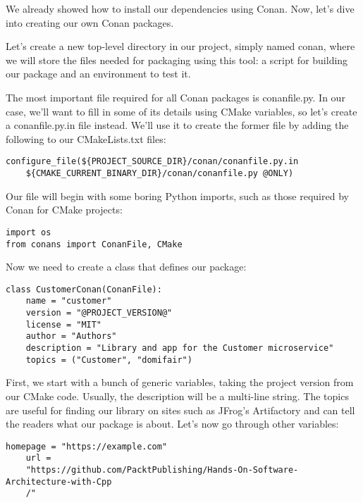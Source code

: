 
We already showed how to install our dependencies using Conan. Now, let's dive into creating our own Conan packages.

Let's create a new top-level directory in our project, simply named conan, where we will store the files needed for packaging using this tool: a script for building our package and an environment to test it.


The most important file required for all Conan packages is conanfile.py. In our case, we'll want to fill in some of its details using CMake variables, so let's create a conanfile.py.in file instead. We'll use it to create the former file by adding the following to our CMakeLists.txt files:

\begin{lstlisting}[style=styleCMake]
configure_file(${PROJECT_SOURCE_DIR}/conan/conanfile.py.in
	${CMAKE_CURRENT_BINARY_DIR}/conan/conanfile.py @ONLY)
\end{lstlisting}

Our file will begin with some boring Python imports, such as those required by Conan for CMake projects:

\begin{lstlisting}[style=stylePython]
import os
from conans import ConanFile, CMake
\end{lstlisting}

Now we need to create a class that defines our package:

\begin{lstlisting}[style=stylePython]
class CustomerConan(ConanFile):
	name = "customer"
	version = "@PROJECT_VERSION@"
	license = "MIT"
	author = "Authors"
	description = "Library and app for the Customer microservice"
	topics = ("Customer", "domifair")
\end{lstlisting}

First, we start with a bunch of generic variables, taking the project version from our CMake code. Usually, the description will be a multi-line string. The topics are useful for finding our library on sites such as JFrog's Artifactory and can tell the readers what our package is about. Let's now go through other variables:

\begin{lstlisting}[style=stylePython]
	homepage = "https://example.com"
	url =
	"https://github.com/PacktPublishing/Hands-On-Software-Architecture-with-Cpp
	/"
\end{lstlisting}

